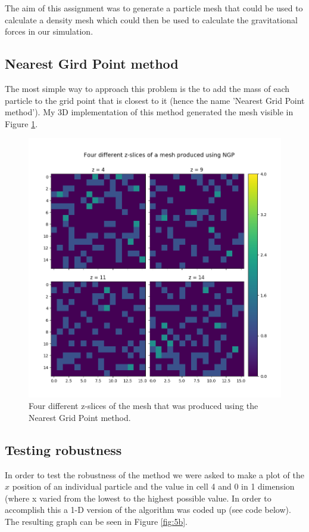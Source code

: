 \documentclass[a4paper,10pt]{article}
\begin{document}
The aim of this assignment was to generate a particle mesh that could be used to calculate a density mesh which could then be used to calculate the gravitational forces in our simulation. 

\subsection{Nearest Gird Point method}

The most simple way to approach this problem is the to add the mass of each particle to the grid point that is closest to it (hence the name 'Nearest Grid Point method'). My 3D implementation of this method generated the mesh visible in Figure \ref{fig:5a}. 

\begin{figure}[h!]
  \centering
  \includegraphics[width=0.7\linewidth]{./plots/5a.png}
  \caption{Four different z-slices of the mesh that was produced using the Nearest Grid Point method.}
  \label{fig:5a}
\end{figure}

\subsection{Testing robustness}

In order to test the robustness of the method we were asked to make a plot of the $x$ position of an individual particle and the value in cell 4 and 0 in 1 dimension (where x varied from the lowest to the highest possible value. In order to accomplish this a 1-D version of the algorithm was coded up (see code below). The resulting graph can be seen in Figure \ref{fig:5b}. 
\end{document}
